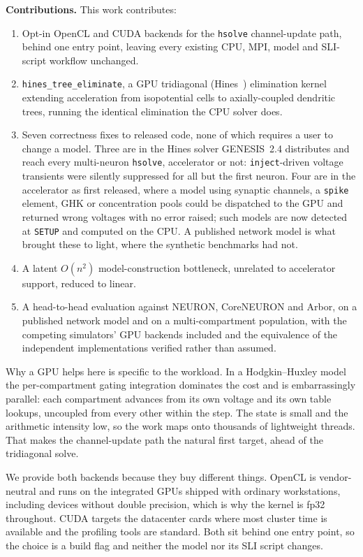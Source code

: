 \documentclass[preprint,12pt, a4paper]{elsarticle}
\newcommand{\hte}{\texttt{hines\_\allowbreak tree\_\allowbreak eliminate}}
\begin{document}
\begin{enumerate}
\textbf{Contributions.} This work contributes:

\begin{enumerate}
\item Opt-in OpenCL and CUDA backends for the \texttt{hsolve} channel-update path, behind one entry point, leaving every existing CPU, MPI, model and SLI-script workflow unchanged.
\item \hte{}, a GPU tridiagonal (Hines~\cite{hines1984efficient}) elimination kernel extending acceleration from isopotential cells to axially-coupled dendritic trees, running the identical elimination the CPU solver does.
\item Seven correctness fixes to released code, none of which requires a user to change a model. Three are in the Hines solver GENESIS~2.4 distributes and reach every multi-neuron \texttt{hsolve}, accelerator or not: \texttt{inject}-driven voltage transients were silently suppressed for all but the first neuron. Four are in the accelerator as first released, where a model using synaptic channels, a \texttt{spike} element, GHK or concentration pools could be dispatched to the GPU and returned wrong voltages with no error raised; such models are now detected at \texttt{SETUP} and computed on the CPU. A published network model is what brought these to light, where the synthetic benchmarks had not.
\item A latent $O(n^2)$ model-construction bottleneck, unrelated to accelerator support, reduced to linear.
\item A head-to-head evaluation against NEURON, CoreNEURON and Arbor, on a published network model and on a multi-compartment population, with the competing simulators' GPU backends included and the equivalence of the independent implementations verified rather than assumed.
\end{enumerate}

Why a GPU helps here is specific to the workload. In a Hodgkin--Huxley model the per-compartment gating integration dominates the cost and is embarrassingly parallel: each compartment advances from its own voltage and its own table lookups, uncoupled from every other within the step. The state is small and the arithmetic intensity low, so the work maps onto thousands of lightweight threads. That makes the channel-update path the natural first target, ahead of the tridiagonal solve.

We provide both backends because they buy different things. OpenCL is vendor-neutral and runs on the integrated GPUs shipped with ordinary workstations, including devices without double precision, which is why the kernel is fp32 throughout. CUDA targets the datacenter cards where most cluster time is available and the profiling tools are standard. Both sit behind one entry point, so the choice is a build flag and neither the model nor its SLI script changes.


\end{enumerate}
\end{document}
